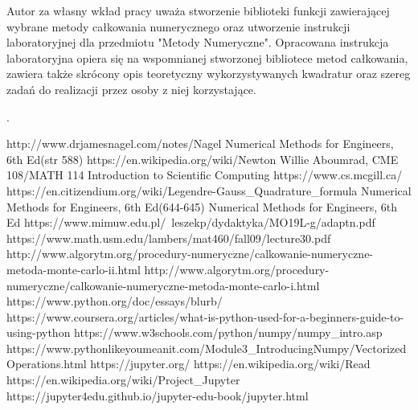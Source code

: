 \documentclass[12pt,twoside]{article}
\begin{document}
 Autor za własny wkład pracy uważa stworzenie biblioteki funkcji zawierającej wybrane metody całkowania numerycznego oraz utworzenie instrukcji laboratoryjnej dla przedmiotu "Metody Numeryczne". Opracowana instrukcja laboratoryjna opiera się na wspomnianej stworzonej bibliotece metod całkowania, zawiera także skrócony opis teoretyczny wykorzystywanych kwadratur oraz szereg zadań do realizacji przez osoby z niej korzystające.
 
.
\clearpage


\begin{thebibliography}{4}
 http://www.drjamesnagel.com/notes/Nagel%
 Numerical Methods for Engineers, 6th Ed(str 588)
 https://en.wikipedia.org/wiki/Newton%
 Willie Aboumrad, CME 108/MATH 114 Introduction to Scientific Computing
 https://www.cs.mcgill.ca/
 https://en.citizendium.org/wiki/Legendre-Gauss\_Quadrature\_formula
 Numerical Methods for Engineers, 6th Ed(644-645)
 Numerical Methods for Engineers, 6th Ed
 https://www.mimuw.edu.pl/~leszekp/dydaktyka/MO19L-g/adaptn.pdf
 https://www.math.usm.edu/lambers/mat460/fall09/lecture30.pdf
 http://www.algorytm.org/procedury-numeryczne/calkowanie-numeryczne-metoda-monte-carlo-ii.html
 http://www.algorytm.org/procedury-numeryczne/calkowanie-numeryczne-metoda-monte-carlo-i.html
 https://www.python.org/doc/essays/blurb/
 https://www.coursera.org/articles/what-is-python-used-for-a-beginners-guide-to-using-python
 https://www.w3schools.com/python/numpy/numpy\_intro.asp
 https://www.pythonlikeyoumeanit.com/Module3\_IntroducingNumpy/VectorizedOperations.html
 https://jupyter.org/
 https://en.wikipedia.org/wiki/Read%
 https://en.wikipedia.org/wiki/Project\_Jupyter
 https://jupyter4edu.github.io/jupyter-edu-book/jupyter.html
\end{thebibliography}

\clearpage

\makesummary
\end{document}
